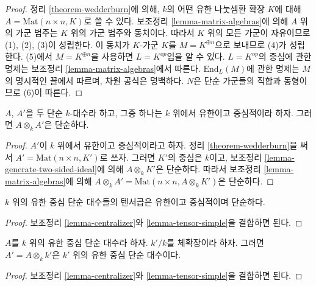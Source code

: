 \begin{proof}
정리 \ref{theorem-wedderburn}에 의해, $k$의 어떤 유한 나눗셈환 확장
$K$에 대해 $A = \text{Mat}(n \times n, K)$로 쓸 수 있다.
보조정리 \ref{lemma-matrix-algebras}에 의해 $A$ 위의 가군 범주는
$K$ 위의 가군 범주와 동치이다. 따라서 $K$ 위의 모든 가군이 자유이므로
(1), (2), (3)이 성립한다. 이 동치가 $K$-가군 $K$를
$M = K^{\oplus n}$으로 보내므로 (4)가 성립한다. (5)에서
$M = K^{\oplus n}$을 사용하면 $L = K^{op}$임을 알 수 있다.
$L = K^{op}$의 중심에 관한 명제는 보조정리
\ref{lemma-matrix-algebras}에서 따른다.
$\text{End}_L(M)$에 관한 명제는 $M$의 명시적인 꼴에서 따르며,
차원 공식은 명백하다. $N$은 단순 가군들의 직합과 동형이므로 (6)이 따른다.
\end{proof}

\begin{lemma}
\label{lemma-tensor-simple}
$A$, $A'$을 두 단순 $k$-대수라 하고, 그중 하나는 $k$ 위에서 유한이고
중심적이라 하자. 그러면 $A \otimes_k A'$은 단순하다.
\end{lemma}

\begin{proof}
$A'$이 $k$ 위에서 유한이고 중심적이라고 하자. 정리
\ref{theorem-wedderburn}을 써서
$A' = \text{Mat}(n \times n, K')$로 쓰자. 그러면 $K'$의 중심은 $k$이고,
보조정리 \ref{lemma-generate-two-sided-ideal}에 의해
$A \otimes_k K'$은 단순하다. 따라서 보조정리
\ref{lemma-matrix-algebras}에 의해
$A \otimes_k A' = \text{Mat}(n \times n, A \otimes_k K')$은 단순하다.
\end{proof}

\begin{lemma}
\label{lemma-tensor-central-simple}
$k$ 위의 유한 중심 단순 대수들의 텐서곱은 유한이고 중심적이며 단순하다.
\end{lemma}

\begin{proof}
보조정리 \ref{lemma-centralizer}와 \ref{lemma-tensor-simple}을 결합하면 된다.
\end{proof}

\begin{lemma}
\label{lemma-base-change}
$A$를 $k$ 위의 유한 중심 단순 대수라 하자. $k'/k$를 체확장이라 하자.
그러면 $A' = A \otimes_k k'$은 $k'$ 위의 유한 중심 단순 대수이다.
\end{lemma}

\begin{proof}
보조정리 \ref{lemma-centralizer}와 \ref{lemma-tensor-simple}을 결합하면 된다.
\end{proof}

